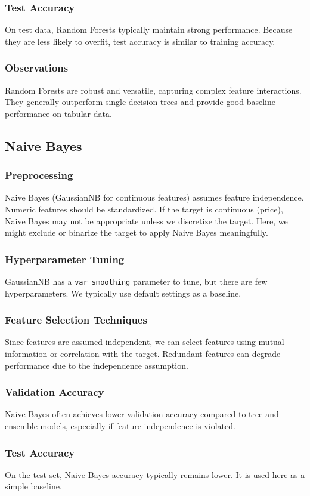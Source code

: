 \documentclass[12pt]{article}
\begin{document}
\subsubsection{Test Accuracy}
On test data, Random Forests typically maintain strong performance. Because they are less likely to overfit, test accuracy is similar to training accuracy.
\subsubsection{Observations}
Random Forests are robust and versatile, capturing complex feature interactions. They generally outperform single decision trees and provide good baseline performance on tabular data.

\subsection{Naive Bayes}
\subsubsection{Preprocessing}
Naive Bayes (GaussianNB for continuous features) assumes feature independence. Numeric features should be standardized. If the target is continuous (price), Naive Bayes may not be appropriate unless we discretize the target. Here, we might exclude or binarize the target to apply Naive Bayes meaningfully.
\subsubsection{Hyperparameter Tuning}
GaussianNB has a \texttt{var\_smoothing} parameter to tune, but there are few hyperparameters. We typically use default settings as a baseline.
\subsubsection{Feature Selection Techniques}
Since features are assumed independent, we can select features using mutual information or correlation with the target. Redundant features can degrade performance due to the independence assumption.
\subsubsection{Validation Accuracy}
Naive Bayes often achieves lower validation accuracy compared to tree and ensemble models, especially if feature independence is violated.
\subsubsection{Test Accuracy}
On the test set, Naive Bayes accuracy typically remains lower. It is used here as a simple baseline.
\end{document}

